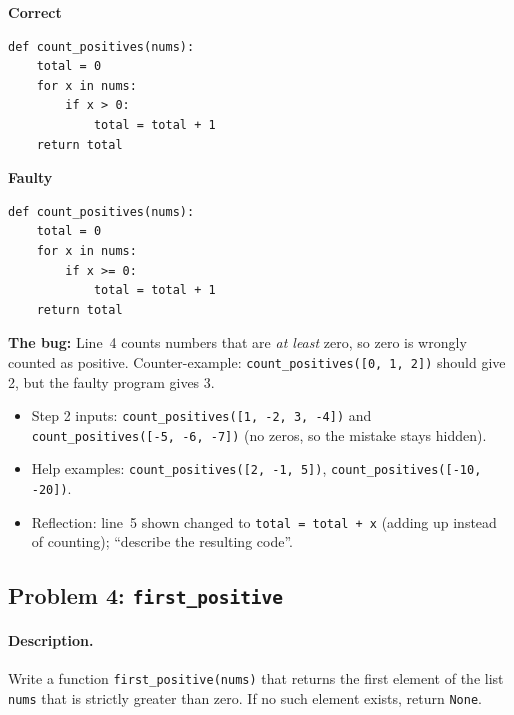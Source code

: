\documentclass[11pt,a4paper]{article}
\newenvironment{codepair}{\par\noindent}{\par\medskip}
\newcommand{\codelabel}[1]{\textbf{\small #1}\par\vspace{2pt}}
\newcommand{\bugnote}[1]{\par\noindent\textcolor{bugred}{\textbf{The bug:}} #1\par\smallskip}
\begin{document}
\begin{codepair}
\begin{minipage}[t]{0.48\textwidth}
\codelabel{Correct}
\begin{lstlisting}
def count_positives(nums):
    total = 0
    for x in nums:
        if x > 0:
            total = total + 1
    return total
\end{lstlisting}
\end{minipage}\hfill
\begin{minipage}[t]{0.48\textwidth}
\codelabel{Faulty}
\begin{lstlisting}
def count_positives(nums):
    total = 0
    for x in nums:
        if x >= 0:
            total = total + 1
    return total
\end{lstlisting}
\end{minipage}
\end{codepair}

\bugnote{Line~4 counts numbers that are \emph{at least} zero, so zero is
wrongly counted as positive. Counter-example:
\texttt{count\_positives([0, 1, 2])} should give 2, but the faulty
program gives 3.}

\begin{itemize}[nosep]
  \item Step 2 inputs: \texttt{count\_positives([1, -2, 3, -4])} and
        \texttt{count\_positives([-5, -6, -7])} (no zeros, so the mistake
        stays hidden).
  \item Help examples: \texttt{count\_positives([2, -1, 5])},
        \texttt{count\_positives([-10, -20])}.
  \item Reflection: line~5 shown changed to \texttt{total = total + x}
        (adding up instead of counting); ``describe the resulting code''.
\end{itemize}

\subsection{Problem 4: \texttt{first\_positive}}

\paragraph{Description.} Write a function \texttt{first\_positive(nums)}
that returns the first element of the list \texttt{nums} that is strictly
greater than zero. If no such element exists, return \texttt{None}.
\end{document}
